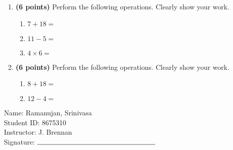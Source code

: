 \documentclass[12pt]{amsart}
\begin{document}
\newpage
\begin{enumerate}
\item {\bf (6 points)} 
 Perform the following operations. Clearly show your work. \begin{enumerate}


\def \a{7}\def \b{18}\def \apb{25}

 
\item $\a + \b = $

\vspace{2cm}
\def \a{11}\def \dif{6}\def \b{5}

 
\item $\a - \b = $

\vspace{2cm}
\def \a{4}\def \b{6}\def \ab{10}

 
\item $\a \times \b = $ 

\vspace{2cm}
\def \vshift{-3}\def \hshift{-2}\def \chang{0}\def \findval{-2}\def \yval{-3}

 
\end{enumerate}


\newpage
\item {\bf (6 points)} 
 Perform the following operations. Clearly show your work. \begin{enumerate}


\def \a{8}\def \b{18}\def \apb{26}

 
\item $\a + \b = $

\vspace{2cm}
\def \a{12}\def \dif{8}\def \b{4}

 
\item $\a - \b = $

\vspace{2cm}
\def \vshift{-5}\def \hshift{-4}\def \chang{-1}\def \findval{-5}\def \yval{-3}

 
\end{enumerate}


\newpage\end{enumerate}\graphicspath{{/Users/jilan/Downloads/Randomizer/Randomizer/Sample Course/Sample Assessment 2/}}\setcounter{page}{1}


\thispagestyle{fancy}

 \noindent Name: Ramanujan, Srinivasa \vspace{.3cm} \\\noindent Student ID: 8675310 \vspace{.3cm} \\\noindent Instructor: J. Brennan \vspace{.3cm} \\\noindent Signature: $\rule{6cm}{0.15mm}$ \vspace{.3cm} \\ 
\end{document}
